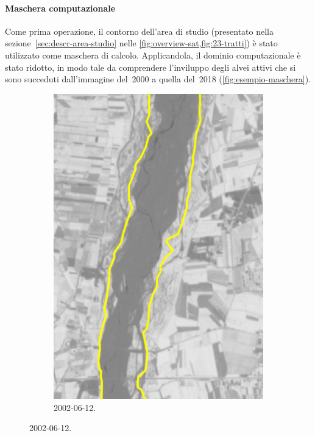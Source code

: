 \paragraph{Maschera computazionale}
Come prima operazione, il contorno dell'area di studio (presentato nella sezione~\ref{sec:descr-area-studio} nelle \cref{fig:overview-sat,fig:23-tratti}) è stato utilizzato come maschera di calcolo.
Applicandola, il dominio computazionale è stato ridotto, in modo tale da comprendere l'inviluppo degli alvei attivi che si sono succeduti dall'immagine del~2000 a quella del~2018 (\cref{fig:esempio-maschera}).
%
\begin{figure}
	\centering
	\begin{subfigure}[b]{0.4\textwidth}
		\includegraphics[width=\textwidth]{files/esempio_mask_2002_06_12.jpeg}
		\caption{\AST{} 2002-06-12.}
	\end{subfigure}

\end{figure}
